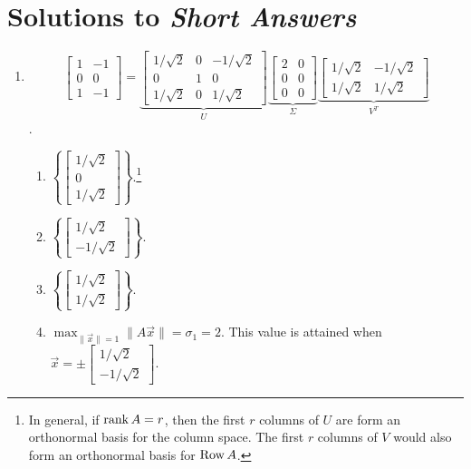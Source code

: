 \section{Solutions to \textit{Short Answers}}
\begin{enumerate}
	\item 
	\[\begin{bmatrix}1 & -1 \\ 0 & 0 \\ 1 & -1\end{bmatrix} = \underbrace{\begin{bmatrix}1/\sqrt{2} & 0  & -1/\sqrt{2} \\ 0 & 1 & 0 \\ 1/\sqrt{2} & 0 & 1/\sqrt{2}\end{bmatrix}}_U \underbrace{\begin{bmatrix}2 & 0 \\ 0 & 0 \\ 0 & 0\end{bmatrix}}_\Sigma\underbrace{\begin{bmatrix}1/\sqrt{2} & -1/\sqrt{2} \\ 1/\sqrt{2} & 1/\sqrt{2}\end{bmatrix}}_{V^T}\].
		\begin{enumerate}
			\item \(\left\{ \begin{bmatrix}1/\sqrt{2} \\ 0 \\ 1/\sqrt{2}\end{bmatrix} \right\}\).\footnote{In general, if \(\operatorname{rank} A = r\), then the first \(r\)
				 columns of \(U\) are form an orthonormal basis for the column space. The first \(r\) columns of \(V\) would also form an orthonormal
				 basis for \(\operatorname{Row} A\).}
			\item \(\left\{ \begin{bmatrix}1/\sqrt{2} \\ -1/\sqrt{2}\end{bmatrix} \right\}\).
			\item \(\left\{ \begin{bmatrix}1/\sqrt{2} \\ 1/\sqrt{2}\end{bmatrix} \right\}\).
			\item \(\max_{\|\vec{x}\| = 1} \|A\vec{x}\| = \sigma_1 = 2\). This value is attained when 
				\(\vec{x} = \pm\begin{bmatrix}1/\sqrt{2} \\ -1/\sqrt{2}\end{bmatrix}\).

\end{enumerate}
\end{enumerate}
